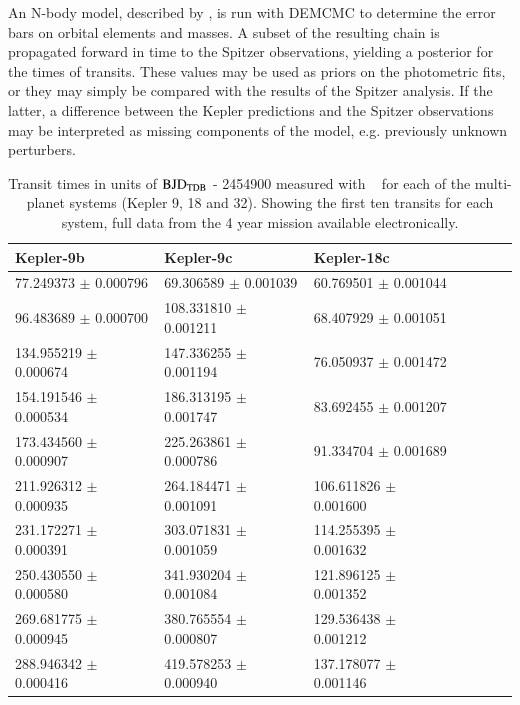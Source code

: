 An N-body model, described by \citep{Fabrycky2010}, is run with DEMCMC to determine the error bars on orbital elements and masses. A subset of the resulting chain is propagated forward in time to the Spitzer observations, yielding a posterior for the times of transits. These values may be used as priors on the photometric fits, or they may simply be compared with the results of the Spitzer analysis. If the latter, a difference between the Kepler predictions and the Spitzer observations may be interpreted as missing components of the model, e.g. previously unknown perturbers.

\begin{table}
\caption{Transit times in units of $\rm BJD_{TDB}$ - 2454900 measured with \Kepler~ for each of the multi-planet systems (Kepler 9, 18 and 32). Showing the first ten transits for each system, full data from the 4 year mission available electronically.}
\label{P4:tab:keplerTs}
    \begin{tabular}{lllllll}
      \hline\hline
      Kepler-9b &  Kepler-9c & Kepler-18c    \\
      \hline
       77.249373 $\pm$    0.000796 &   69.306589 $\pm$    0.001039 &  60.769501 $\pm$     0.001044    \\
       96.483689 $\pm$    0.000700 &  108.331810 $\pm$    0.001211 &  68.407929 $\pm$     0.001051    \\
      134.955219 $\pm$    0.000674 &  147.336255 $\pm$    0.001194 &  76.050937 $\pm$     0.001472    \\
      154.191546 $\pm$    0.000534 &  186.313195 $\pm$    0.001747 &  83.692455 $\pm$     0.001207    \\
      173.434560 $\pm$    0.000907 &  225.263861 $\pm$    0.000786 &  91.334704 $\pm$     0.001689    \\
      211.926312 $\pm$    0.000935 &  264.184471 $\pm$    0.001091 & 106.611826 $\pm$     0.001600    \\
      231.172271 $\pm$    0.000391 &  303.071831 $\pm$    0.001059 & 114.255395 $\pm$     0.001632    \\
      250.430550 $\pm$    0.000580 &  341.930204 $\pm$    0.001084 & 121.896125 $\pm$     0.001352    \\
      269.681775 $\pm$    0.000945 &  380.765554 $\pm$    0.000807 & 129.536438 $\pm$     0.001212    \\
      288.946342 $\pm$    0.000416 &  419.578253 $\pm$    0.000940 & 137.178077 $\pm$     0.001146    \\

\end{tabular}
\end{table}
